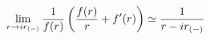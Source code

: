 \begin{equation}
\lim_{r \rightarrow i r_{(-)}} {1 \over f(r)} \left ( {f(r) \over r} + f'(r) \right ) \simeq
{1 \over {r- i r_{(-)}}}
\label{coef1_rmp}
\end{equation}

